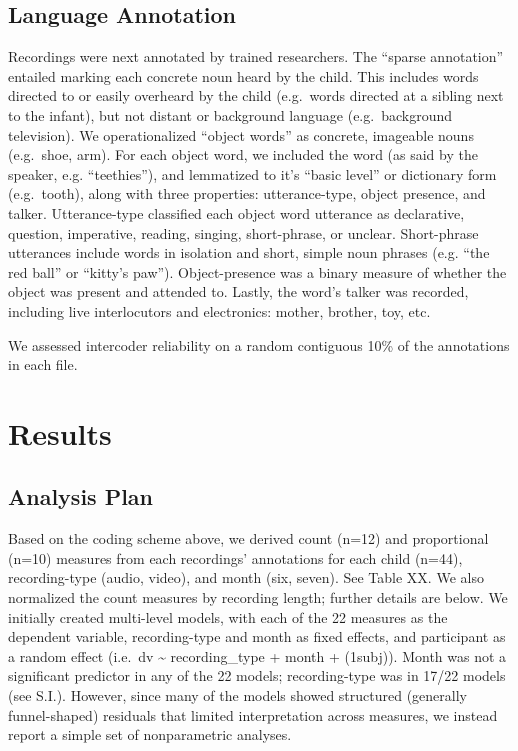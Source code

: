 \documentclass[man]{apa6}
\theoremstyle{definition}
\theoremstyle{definition}
\theoremstyle{definition}
\theoremstyle{remark}
\begin{document}
\subsection{Language Annotation}\label{language-annotation}

Recordings were next annotated by trained researchers. The
\enquote{sparse annotation} entailed marking each concrete noun heard by
the child. This includes words directed to or easily overheard by the
child (e.g.~words directed at a sibling next to the infant), but not
distant or background language (e.g.~background television). We
operationalized \enquote{object words} as concrete, imageable nouns
(e.g.~shoe, arm). For each object word, we included the word (as said by
the speaker, e.g. \enquote{teethies}), and lemmatized to it's
\enquote{basic level} or dictionary form (e.g.~tooth), along with three
properties: utterance-type, object presence, and talker. Utterance-type
classified each object word utterance as declarative, question,
imperative, reading, singing, short-phrase, or unclear. Short-phrase
utterances include words in isolation and short, simple noun phrases
(e.g. \enquote{the red ball} or \enquote{kitty's paw}). Object-presence
was a binary measure of whether the object was present and attended to.
Lastly, the word's talker was recorded, including live interlocutors and
electronics: mother, brother, toy, etc.

We assessed intercoder reliability on a random contiguous 10\% of the
annotations in each file.

\section{Results}\label{results}

\subsection{Analysis Plan}\label{analysis-plan}

Based on the coding scheme above, we derived count (n=12) and
proportional (n=10) measures from each recordings' annotations for each
child (n=44), recording-type (audio, video), and month (six, seven). See
Table XX. We also normalized the count measures by recording length;
further details are below. We initially created multi-level models, with
each of the 22 measures as the dependent variable, recording-type and
month as fixed effects, and participant as a random effect (i.e.~dv
\textasciitilde{} recording\_type + month + (1\textbar{}subj)). Month
was not a significant predictor in any of the 22 models; recording-type
was in 17/22 models (see S.I.). However, since many of the models showed
structured (generally funnel-shaped) residuals that limited
interpretation across measures, we instead report a simple set of
nonparametric analyses.
\end{document}
